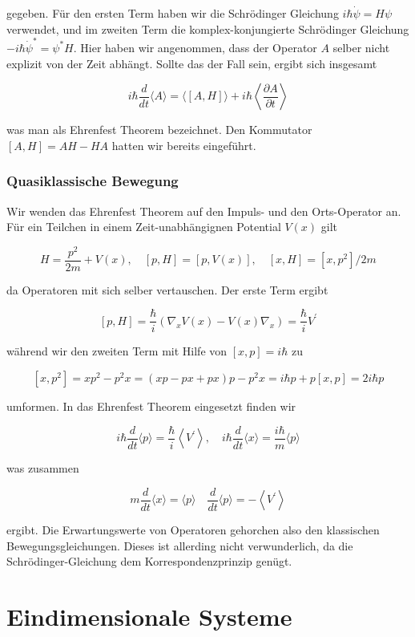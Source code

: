 \documentclass[10pt, letterpaper]{article}
\begin{document}
gegeben. Für den ersten Term haben wir die Schrödinger Gleichung $i \hbar \dot{\psi}=H \psi$ verwendet, und im zweiten Term die komplex-konjungierte Schrödinger Gleichung $-i \hbar \dot{\psi}^{*}=\psi^{*} H$. Hier haben wir angenommen, dass der Operator $A$ selber nicht explizit von der Zeit abhängt. Sollte das der Fall sein, ergibt sich insgesamt

$$
i \hbar \frac{d}{d t}\langle A\rangle=\langle[A, H]\rangle+i \hbar\left\langle\frac{\partial A}{\partial t}\right\rangle
$$

was man als Ehrenfest Theorem bezeichnet. Den Kommutator $[A, H]=A H-H A$ hatten wir bereits eingeführt.

\subsubsection*{Quasiklassische Bewegung}
Wir wenden das Ehrenfest Theorem auf den Impuls- und den Orts-Operator an. Für ein Teilchen in einem Zeit-unabhängignen Potential $V(x)$ gilt

$$
H=\frac{p^{2}}{2 m}+V(x), \quad[p, H]=[p, V(x)], \quad[x, H]=\left[x, p^{2}\right] / 2 m
$$

da Operatoren mit sich selber vertauschen. Der erste Term ergibt

$$
[p, H]=\frac{\hbar}{i}\left(\nabla_{x} V(x)-V(x) \nabla_{x}\right)=\frac{\hbar}{i} V^{\prime}
$$

während wir den zweiten Term mit Hilfe von $[x, p]=i \hbar$ zu

$$
\left[x, p^{2}\right]=x p^{2}-p^{2} x=(x p-p x+p x) p-p^{2} x=i \hbar p+p[x, p]=2 i \hbar p
$$

umformen. In das Ehrenfest Theorem eingesetzt finden wir

$$
i \hbar \frac{d}{d t}\langle p\rangle=\frac{\hbar}{i}\left\langle V^{\prime}\right\rangle, \quad i \hbar \frac{d}{d t}\langle x\rangle=\frac{i \hbar}{m}\langle p\rangle
$$

was zusammen

$$
m \frac{d}{d t}\langle x\rangle=\langle p\rangle \quad \frac{d}{d t}\langle p\rangle=-\left\langle V^{\prime}\right\rangle
$$

ergibt. Die Erwartungswerte von Operatoren gehorchen also den klassischen Bewegungsgleichungen. Dieses ist allerding nicht verwunderlich, da die Schrödinger-Gleichung dem Korrespondenzprinzip genügt.


\pagebreak


\section{Eindimensionale Systeme}
\end{document}
